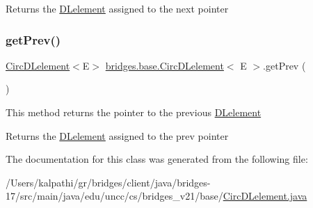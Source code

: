 \begin{DoxyReturn}{Returns}
the \mbox{\hyperlink{classbridges_1_1base_1_1_d_lelement}{D\+Lelement}} assigned to the next pointer 
\end{DoxyReturn}
\mbox{\label{classbridges_1_1base_1_1_circ_d_lelement_aa2b83017a571694460f77dd31b4188ed}} 
\subsubsection{\texorpdfstring{get\+Prev()}{getPrev()}}
{\footnotesize\ttfamily \mbox{\hyperlink{classbridges_1_1base_1_1_circ_d_lelement}{Circ\+D\+Lelement}}$<$E$>$ \mbox{\hyperlink{classbridges_1_1base_1_1_circ_d_lelement}{bridges.\+base.\+Circ\+D\+Lelement}}$<$ E $>$.get\+Prev (\begin{DoxyParamCaption}{ }\end{DoxyParamCaption})}

This method returns the pointer to the previous \mbox{\hyperlink{classbridges_1_1base_1_1_d_lelement}{D\+Lelement}}

\begin{DoxyReturn}{Returns}
the \mbox{\hyperlink{classbridges_1_1base_1_1_d_lelement}{D\+Lelement}} assigned to the prev pointer 
\end{DoxyReturn}


The documentation for this class was generated from the following file\+:\begin{DoxyCompactItemize}
\item 
/\+Users/kalpathi/gr/bridges/client/java/bridges-\/17/src/main/java/edu/uncc/cs/bridges\+\_\+v21/base/\mbox{\hyperlink{_circ_d_lelement_8java}{Circ\+D\+Lelement.\+java}}\end{DoxyCompactItemize}
